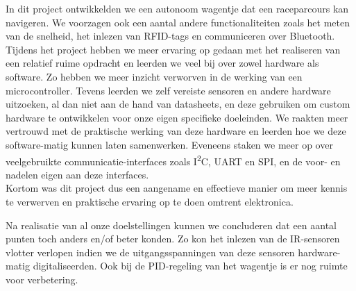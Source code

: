 In dit project ontwikkelden we een autonoom wagentje dat een raceparcours kan navigeren. We voorzagen ook een aantal andere functionaliteiten zoals het meten van de snelheid, het inlezen van RFID-tags en communiceren over Bluetooth.
Tijdens het project hebben we meer ervaring op gedaan met het realiseren van een relatief ruime opdracht en leerden we veel bij over zowel hardware als software. Zo hebben we meer inzicht verworven in de werking van een microcontroller. Tevens leerden we zelf vereiste sensoren en andere hardware uitzoeken, al dan niet aan de hand van datasheets, en deze gebruiken om custom hardware te ontwikkelen voor onze eigen specifieke doeleinden. We raakten meer vertrouwd met de praktische werking van deze hardware en leerden hoe we deze software-matig kunnen laten samenwerken. Eveneens staken we meer op over veelgebruikte communicatie-interfaces zoals I\textsuperscript{2}C, UART en SPI, en de voor- en nadelen eigen aan deze interfaces.\\
Kortom was dit project dus een aangename en effectieve manier om meer kennis te verwerven en praktische ervaring op te doen omtrent elektronica.

Na realisatie van al onze doelstellingen kunnen we concluderen dat een aantal punten toch anders en/of beter konden. Zo kon het inlezen van de IR-sensoren vlotter verlopen indien we de uitgangsspanningen van deze sensoren hardware-matig digitaliseerden. Ook bij de PID-regeling van het wagentje is er nog ruimte voor verbetering.